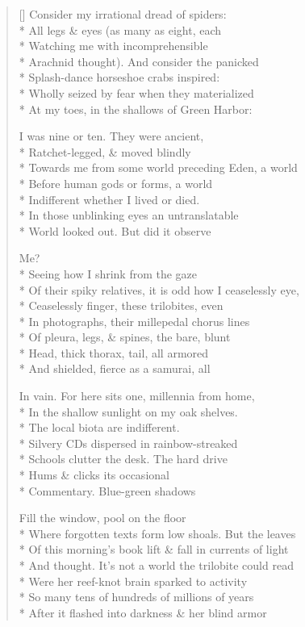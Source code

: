 \label{ch:fossil_life}
\settowidth{\versewidth}{Of their spiky relatives, it is odd how I ceaselessly eye,}
\begin{verse}[\versewidth]
Consider my irrational dread of spiders:\\*
All legs \& eyes (as many as eight, each\\*
Watching me with incomprehensible \\*
Arachnid thought). And consider the panicked \\*
Splash-dance horseshoe crabs inspired:\\*
Wholly seized by fear when they materialized\\*
At my toes, in the shallows of Green Harbor:

I was nine or ten. They were ancient, \\*
Ratchet-legged, \& moved blindly\\*
Towards me from some world preceding Eden, a world\\*
Before human gods or forms, a world\\*
Indifferent whether I lived or died.\\*
In those unblinking eyes an untranslatable\\*
World looked out.  But did it observe

Me?\\*
 \qquad Seeing how I shrink from the gaze\\*
Of their spiky relatives, it is odd how I ceaselessly eye,\\*
Ceaselessly finger, these trilobites, even\\*
In photographs, their millepedal chorus lines\\*
Of pleura, legs, \& spines, the bare, blunt\\*
Head, thick thorax, tail, all armored\\*
And shielded, fierce as a samurai, all

In vain.  For here sits one, millennia from home,\\*
In the shallow sunlight on my oak shelves.\\*
The local biota are indifferent.\\*
Silvery CDs dispersed in rainbow-streaked\\*
Schools clutter the desk.  The hard drive\\*
Hums \& clicks its occasional\\*
Commentary. Blue-green shadows

Fill the window, pool on the floor\\*
Where forgotten texts form low shoals. But the leaves\\*
Of this morning's book lift \& fall in currents of light\\*
And thought. It's not a world the trilobite could read\\*
Were her reef-knot brain sparked to activity\\*
So many tens of hundreds of millions of years\\*
After it flashed into darkness \& her blind armor


\end{verse}
